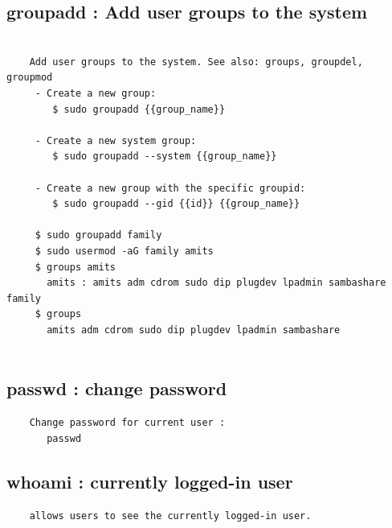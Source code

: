 \documentclass[a4paper,12pt]{article}
\begin{document}
\subsection{groupadd   : Add user groups to the system}
\begin{verbatim}

    Add user groups to the system. See also: groups, groupdel, groupmod 
     - Create a new group:
        $ sudo groupadd {{group_name}}

     - Create a new system group:
        $ sudo groupadd --system {{group_name}}

     - Create a new group with the specific groupid:
        $ sudo groupadd --gid {{id}} {{group_name}}

     $ sudo groupadd family
     $ sudo usermod -aG family amits
     $ groups amits
       amits : amits adm cdrom sudo dip plugdev lpadmin sambashare family
     $ groups
       amits adm cdrom sudo dip plugdev lpadmin sambashare


\end{verbatim}



\subsection{passwd   : change password}
\begin{verbatim}
    Change password for current user : 
       passwd
\end{verbatim}

\subsection{whoami   : currently logged-in user}
\begin{verbatim}
    allows users to see the currently logged-in user.
\end{verbatim}
\end{document}
